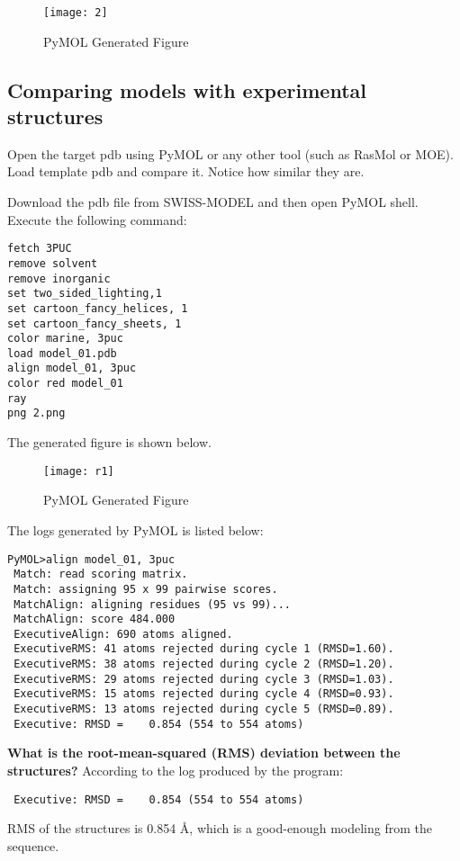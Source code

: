 \documentclass[en,black,12pt,normal]{elegantnote}
\begin{document}
\begin{figure}[H]
    \centering
    \texttt{[image: 2]}
    \caption{PyMOL Generated Figure}
    \label{3PUCCOL}
\end{figure}


\subsection{Comparing models with experimental structures}
Open the target pdb using PyMOL or any other tool (such as RasMol or MOE). 
Load template pdb and compare it. Notice how similar they are.


Download the pdb file from SWISS-MODEL and then open PyMOL shell. 
Execute the following command:

\begin{lstlisting}
fetch 3PUC
remove solvent
remove inorganic
set two_sided_lighting,1
set cartoon_fancy_helices, 1
set cartoon_fancy_sheets, 1
color marine, 3puc
load model_01.pdb
align model_01, 3puc 
color red model_01
ray 
png 2.png
\end{lstlisting}

The generated figure is shown below.

\begin{figure}[H]
    \centering
    \texttt{[image: r1]}
    \caption{PyMOL Generated Figure}
    \label{3PUCALI}
\end{figure}


The logs generated by PyMOL is listed below:

\begin{lstlisting}
PyMOL>align model_01, 3puc
 Match: read scoring matrix.
 Match: assigning 95 x 99 pairwise scores.
 MatchAlign: aligning residues (95 vs 99)...
 MatchAlign: score 484.000
 ExecutiveAlign: 690 atoms aligned.
 ExecutiveRMS: 41 atoms rejected during cycle 1 (RMSD=1.60).
 ExecutiveRMS: 38 atoms rejected during cycle 2 (RMSD=1.20).
 ExecutiveRMS: 29 atoms rejected during cycle 3 (RMSD=1.03).
 ExecutiveRMS: 15 atoms rejected during cycle 4 (RMSD=0.93).
 ExecutiveRMS: 13 atoms rejected during cycle 5 (RMSD=0.89).
 Executive: RMSD =    0.854 (554 to 554 atoms)
\end{lstlisting}


\textbf{What is the root-mean-squared (RMS) deviation between the structures?}
According to the log produced by the program:
\begin{lstlisting}
 Executive: RMSD =    0.854 (554 to 554 atoms)
\end{lstlisting}
RMS of the structures is 0.854 Å, which is a good-enough modeling from the sequence.
\end{document}
